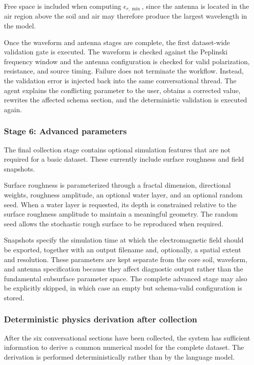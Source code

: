 \documentclass[journal]{IEEEtran}
\begin{document}
Free space is included when computing \(\epsilon_{r,\min}\), since the antenna is located in the air region above the soil and air may therefore produce the largest wavelength in the model.

Once the waveform and antenna stages are complete, the first dataset-wide validation gate is executed. The waveform is checked against the Peplinski frequency window and the antenna configuration is checked for valid polarization, resistance, and source timing. Failure does not terminate the workflow. Instead, the validation error is injected back into the same conversational thread. The agent explains the conflicting parameter to the user, obtains a corrected value, rewrites the affected schema section, and the deterministic validation is executed again.

\subsubsection{Stage 6: Advanced parameters}

The final collection stage contains optional simulation features that are not required for a basic dataset. These currently include surface roughness and field snapshots.

Surface roughness is parameterized through a fractal dimension, directional weights, roughness amplitude, an optional water layer, and an optional random seed. When a water layer is requested, its depth is constrained relative to the surface roughness amplitude to maintain a meaningful geometry. The random seed allows the stochastic rough surface to be reproduced when required.

Snapshots specify the simulation time at which the electromagnetic field should be exported, together with an output filename and, optionally, a spatial extent and resolution. These parameters are kept separate from the core soil, waveform, and antenna specification because they affect diagnostic output rather than the fundamental subsurface parameter space. The complete advanced stage may also be explicitly skipped, in which case an empty but schema-valid configuration is stored.

\subsubsection{Deterministic physics derivation after collection}

After the six conversational sections have been collected, the system has sufficient information to derive a common numerical model for the complete dataset. The derivation is performed deterministically rather than by the language model.
\end{document}
